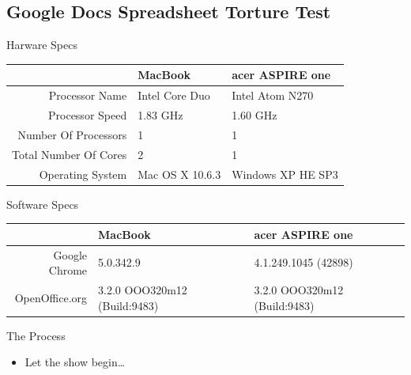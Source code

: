 \documentclass{beamer}
\begin{document}
\subsection[GDocs Spreadsheet Testing]{Google Docs Spreadsheet Torture Test}

\begin{frame}{Harware Specs}
  \resizebox{10cm}{!} {
  \begin{tabular}{| r | p{5cm} | p{5cm} |}
    \hline
                          & MacBook          & acer ASPIRE one   \\ \hline
    Processor Name        & Intel Core Duo   & Intel Atom N270   \\ \hline
    Processor Speed       & 1.83 GHz         & 1.60 GHz          \\ \hline
    Number Of Processors  & 1                & 1                 \\ \hline
    Total Number Of Cores & 2                & 1                 \\ \hline
    Operating System      & Mac OS X 10.6.3  & Windows XP HE SP3 \\ \hline
    \hline
  \end{tabular}
}
\end{frame}

\begin{frame}{Software Specs}
  \resizebox{10cm}{!} {
  \begin{tabular}{| r | p{5cm} | p{5cm} |}
    \hline
                                 & MacBook     & acer ASPIRE one \\ \hline
    Google Chrome                & 5.0.342.9                    & 4.1.249.1045 (42898)               \\ \hline
    OpenOffice.org               & 3.2.0 OOO320m12 (Build:9483) & 3.2.0 OOO320m12 (Build:9483)       \\
    \hline
  \end{tabular}
}
\end{frame}

\begin{frame}{The Process}
  \begin{itemize}
  \item Let the show begin\dots
  \end{itemize}
\end{frame}
\end{document}
